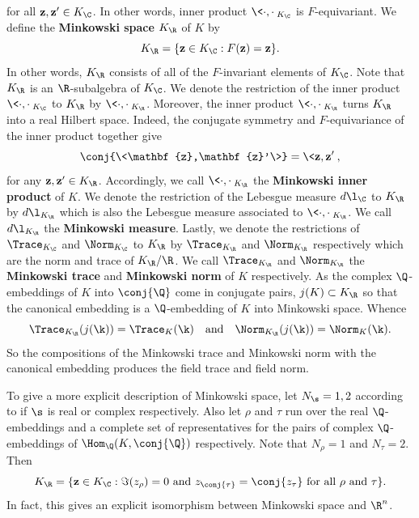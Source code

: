 \documentclass[12pt]{article}
\begin{document}
      for all \(\mathbf{z},\mathbf{z}' \in K_{\C}\). In other words, inner product \(\<\cdot,\cdot\>_{K_{\C}}\) is \(F\)-equivariant. We define the \textbf{Minkowski space} \(K_{\R}\) of \(K\) by
      \[
        K_{\R} = \{\mathbf{z} \in K_{\C}:F(\mathbf{z}) = \mathbf{z}\}.
      \]
      In other words, \(K_{\R}\) consists of all of the \(F\)-invariant elements of \(K_{\C}\). Note that \(K_{\R}\) is an \(\R\)-subalgebra of \(K_{\C}\). We denote the restriction of the inner product \(\<\cdot,\cdot\>_{K_{\C}}\) to \(K_{\R}\) by \(\<\cdot,\cdot\>_{K_{\R}}\). Moreover, the inner product \(\<\cdot,\cdot\>_{K_{\R}}\) turns \(K_{\R}\) into a real Hilbert space. Indeed, the conjugate symmetry and \(F\)-equivariance of the inner product together give
      \[
        \conj{\<\mathbf{z},\mathbf{z}'\>} = \<\mathbf{z},\mathbf{z}'\>,
      \]
      for any \(\mathbf{z},\mathbf{z}' \in K_{\R}\). Accordingly, we call \(\<\cdot,\cdot\>_{K_{\R}}\) the \textbf{Minkowski inner product} of \(K\). We denote the restriction of the Lebesgue measure \(d\l_{\C}\) to \(K_{\R}\) by \(d\l_{K_{\R}}\) which is also the Lebesgue measure associated to \(\<\cdot,\cdot\>_{K_{\R}}\). We call \(d\l_{K_{\R}}\) the \textbf{Minkowski measure}. Lastly, we denote the restrictions of \(\Trace_{K_{\C}}\) and \(\Norm_{K_{\C}}\) to \(K_{\R}\) by \(\Trace_{K_{\R}}\) and \(\Norm_{K_{\R}}\) respectively which are the norm and trace of \(K_{\R}/\R\). We call \(\Trace_{K_{\R}}\) and \(\Norm_{K_{\R}}\) the \textbf{Minkowski trace} and \textbf{Minkowski norm} of \(K\) respectively. As the complex \(\Q\)-embeddings of \(K\) into \(\conj{\Q}\) come in conjugate pairs, \(j(K) \subset K_{\R}\) so that the canonical embedding is a \(\Q\)-embedding of \(K\) into Minkowski space. Whence
      \[
        \Trace_{K_{\R}}(j(\k)) = \Trace_{K}(\k) \quad \text{and} \quad \Norm_{K_{\R}}(j(\k)) = \Norm_{K}(\k).
      \]
      So the compositions of the Minkowski trace and Minkowski norm with the canonical embedding produces the field trace and field norm.
      
      To give a more explicit description of Minkowski space, let \(N_{\s} = 1,2\) according to if \(\s\) is real or complex respectively. Also let \(\rho\) and \(\tau\) run over the real \(\Q\)-embeddings and a complete set of representatives for the pairs of complex \(\Q\)-embeddings of \(\Hom_{\Q}(K,\conj{\Q})\) respectively. Note that \(N_{\rho} = 1\) and \(N_{\tau} = 2\). Then
      \[
        K_{\R} = \{\mathbf{z} \in K_{\C}:\Im(z_{\rho}) = 0 \text{ and } z_{\conj{\tau}} = \conj{z_{\tau}} \text{ for all } \rho \text{ and } \tau\}.
      \]
      In fact, this gives an explicit isomorphism between Minkowski space and \(\R^{n}\).
      
\end{document}
